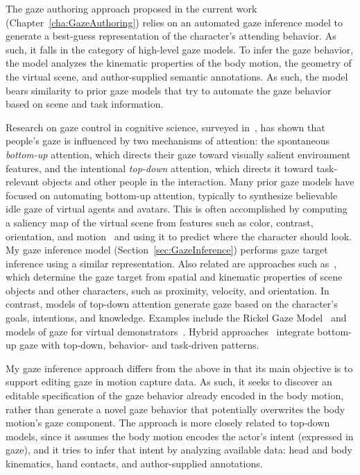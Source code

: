 The gaze authoring approach proposed in the current work (Chapter~\ref{cha:GazeAuthoring}) relies on an automated gaze inference model to generate a best-guess representation of the character's attending behavior. As such, it falls in the category of high-level gaze models. To infer the gaze behavior, the model analyzes the kinematic properties of the body motion, the geometry of the virtual scene, and author-supplied semantic annotations. As such, the model bears similarity to prior gaze models that try to automate the gaze behavior based on scene and task information.

Research on gaze control in cognitive science, surveyed in~\cite{henderson2003human}, has shown that people's gaze is influenced by two mechanisms of attention: the spontaneous \emph{bottom-up} attention, which directs their gaze toward visually salient environment features, and the intentional \emph{top-down} attention, which directs it toward task-relevant objects and other people in the interaction.
Many prior gaze models have focused on automating bottom-up attention, typically to synthesize believable idle gaze of virtual agents and avatars. This is often accomplished by computing a saliency map of the virtual scene from features such as color, contrast, orientation, and motion~\cite{peters2003bottomup,peters2008applying} and using it to predict where the character should look. My gaze inference model (Section~\ref{sec:GazeInference}) performs gaze target inference using a similar representation.
Also related are approaches such as~\cite{cafaro2009animating,grillon2009crowds,kokkinara2011modelling}, which determine the gaze target from spatial and kinematic properties of scene objects and other characters, such as proximity, velocity, and orientation. In contrast, models of top-down attention generate gaze based on the character's goals, intentions, and knowledge. Examples include the Rickel Gaze Model~\cite{lee2007rickel} and models of gaze for virtual demonstrators~\cite{huang16planning}. Hybrid approaches~\cite{khullar2001look,mitake2007reactive} integrate bottom-up gaze with top-down, behavior- and task-driven patterns.

My gaze inference approach differs from the above in that its main objective is to support editing gaze in motion capture data. As such, it seeks to discover an editable specification of the gaze behavior already encoded in the body motion, rather than generate a novel gaze behavior that potentially overwrites the body motion's gaze component. The approach is more closely related to top-down models, since it assumes the body motion encodes the actor's intent (expressed in gaze), and it tries to infer that intent by analyzing available data: head and body kinematics, hand contacts, and author-supplied annotations.

